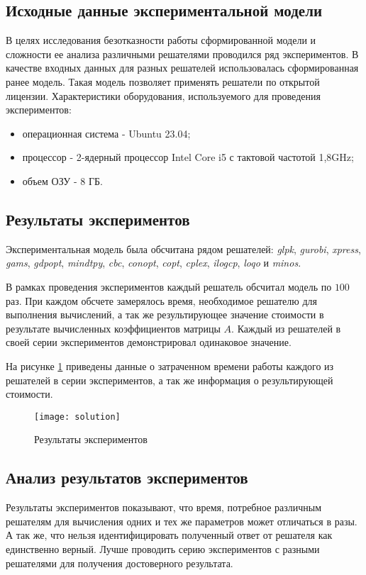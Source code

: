\subsection*{Исходные данные экспериментальной модели}
В целях исследования безотказности работы сформированной модели и сложности ее анализа различными решателями проводился ряд экспериментов. В качестве входных данных для разных решателей использовалась сформированная ранее модель. Такая модель позволяет применять решатели по открытой лицензии.
Характеристики оборудования, используемого для проведения экспериментов:
\begin{itemize}
  \item операционная система - Ubuntu 23.04;
  \item процессор - 2-ядерный процессор Intel Core i5 с тактовой частотой 1,8GHz;
  \item объем ОЗУ - 8 ГБ.
\end{itemize}

\subsection*{Результаты экспериментов}
Экспериментальная модель была обсчитана рядом решателей: \textit{glpk}, \textit{gurobi}, \textit{xpress}, \textit{gams}, \textit{gdpopt}, \textit{mindtpy}, \textit{cbc}, \textit{conopt}, \textit{copt}, \textit{cplex}, \textit{ilogcp}, \textit{loqo} и \textit{minos}.

В рамках проведения экспериментов каждый решатель обсчитал модель по $100$ раз. При каждом обсчете замерялось время, необходимое решателю для выполнения вычислений, а так же результирующее значение стоимости в результате вычисленных коэффициентов матрицы $A$. Каждый из решателей в своей серии экспериментов демонстрировал одинаковое значение.

На рисунке \ref{fig:solution} приведены данные о затраченном времени работы каждого из решателей в серии экспериментов, а так же информация о результирующей стоимости.

\begin{figure}[H]
  \centering
  \texttt{[image: solution]}
  \caption{Результаты экспериментов}
  \label{fig:solution}
\end{figure}

\subsection*{Анализ результатов экспериментов}
Результаты экспериментов показывают, что время, потребное различным решателям для вычисления одних и тех же параметров может отличаться в разы. А так же, что нельзя идентифицировать полученный ответ от решателя как единственно верный. Лучше проводить серию экспериментов с разными решателями для получения достоверного результата.

